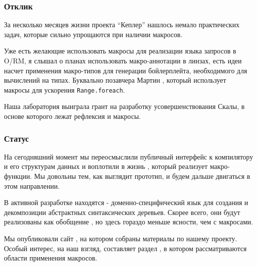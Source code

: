 \documentclass[hyperref={bookmarks=false}]{beamer}
\begin{document}
\begin{frame}[t,fragile]
\frametitle{Отклик}

За несколько месяцев жизни проекта ``Кеплер'' нашлось немало практических задач, которые сильно упрощаются при наличии макросов.

Уже есть желающие использовать макросы для реализации языка запросов в O/RM, я слышал о планах использовать макро-аннотации в линзах, есть идеи насчет применения макро-типов для генерации бойлерплейта, необходимого для вычислений на типах. Буквально позавчера Мартин , который использует макросы для ускорения \texttt{Range.foreach}.

Наша лаборатория выиграла грант  на разработку усовершенствования Скалы, в основе которого лежат рефлексия и макросы.
\end{frame}

\begin{frame}[t,fragile]
\frametitle{Статус}

На сегодняшний момент мы переосмыслили публичный интерфейс к компилятору и его структурам данных и воплотили в жизнь , который реализует макро-функции. Мы довольны тем, как выглядит прототип, и будем дальше двигаться в этом направлении.

В активной разработке находятся  - доменно-специфический язык для создания и декомпозиции абстрактных синтаксических деревьев. Скорее всего, они будут реализованы как обобщение , но здесь гораздо меньше ясности, чем с макросами.

Мы опубликовали сайт , на котором собраны материалы по нашему проекту. Особый интерес, на наш взгляд, составляет раздел , в котором рассматриваются области применения макросов.
\end{frame}
\end{document}
